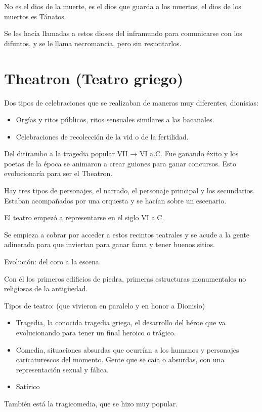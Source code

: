 No es el dios de la muerte, es el dios que guarda a los muertos, el dios de los muertos es Tánatos.

Se les hacía llamadas a estos dioses del inframundo para comunicarse con los difuntos, y se le llama necromancia, pero sin resucitarlos.

\section{Theatron (Teatro griego)}
Dos tipos de celebraciones que se realizaban de maneras muy diferentes, dionisias:
\begin{itemize}
	\item Orgías y ritos públicos, ritos sensuales similares a las bacanales.
	\item Celebraciones de recolección de la vid o de la fertilidad.
\end{itemize}

Del ditirambo a la tragedia popular VII → VI a.C. Fue ganando éxito y los poetas de la época se animaron a crear guiones para ganar concursos. Esto evolucionaría para ser el Theatron.

Hay tres tipos de personajes, el narrado, el personaje principal y los secundarios. Estaban acompañados por una orquesta y se hacían sobre un escenario.

El teatro empezó a representarse en el siglo VI a.C.

Se empieza a cobrar por acceder a estos recintos teatrales y se acude a la gente adinerada para que inviertan para ganar fama y tener buenos sitios.

Evolución: del coro a la escena.

Con él los primeros edificios de piedra, primeras estructuras monumentales no religiosas de la antigüedad.

Tipos de teatro: (que vivieron en paralelo y en honor a Dionisio)
\begin{itemize}
	\item Tragedia, la conocida tragedia griega, el desarrollo del héroe que va evolucionando para tener un final heroico o trágico.
	\item Comedia, situaciones absurdas que ocurrían a los humanos y personajes caricaturescos del momento. Gente que se caía o absurdas, con una representación sexual y fálica.
	\item Satírico
\end{itemize}

También está la tragicomedia, que se hizo muy popular.


